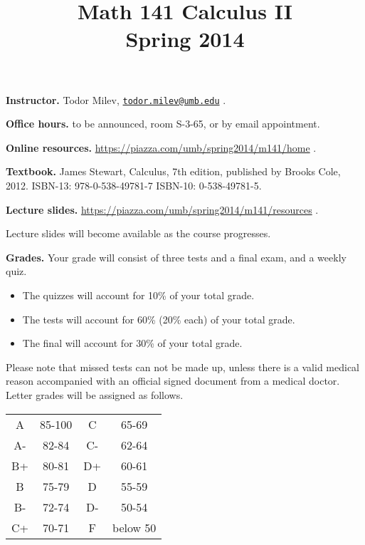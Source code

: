 \documentclass{article}
\title{Math 141 Calculus II \\ Spring 2014}
\begin{document}
\maketitle

\noindent \textbf{Instructor.} Todor Milev, \href{mailto:todor.milev@umb.edu}{\nolinkurl{todor.milev@umb.edu}} \quad \quad \quad .

\medskip
\noindent \textbf{Office hours. } to be announced, room S-3-65, or by email appointment.

\medskip
\noindent \textbf{Online resources. }  \url{https://piazza.com/umb/spring2014/m141/home}  \quad \quad \quad .


\medskip\noindent \textbf{Textbook. }  James Stewart, Calculus, 7th edition, published by Brooks Cole, 2012. ISBN-13: 978-0-538-49781-7
ISBN-10: 0-538-49781-5.

\medskip \noindent \textbf{Lecture slides. } \url{https://piazza.com/umb/spring2014/m141/resources} \quad \quad \quad .

\medskip\noindent Lecture slides will become available as the course progresses.



\medskip
\noindent \textbf{Grades.} Your grade will consist of three tests and a final exam, and a weekly quiz. 
\begin{itemize}
\item The quizzes will account for 10\% of your total grade.
\item The tests will account for 60\% (20\% each) of your total grade.
\item The final will account for 30\% of your total grade.
\end{itemize}
Please note that missed tests can not be made up, unless there is a valid medical reason accompanied with an official signed document from a medical doctor. Letter grades will be assigned as follows. 

\begin{center}
\begin{tabular}{cc|cc}
A & 85-100 & C & 65-69 \\
A-& 82-84 & C- & 62-64 \\
B+& 80-81 & D+ & 60-61 \\
B & 75-79& D & 55-59\\
B-& 72-74& D- & 50-54\\
C+& 70-71& F & below 50\\
\end{tabular}

\end{center}
\end{document}

